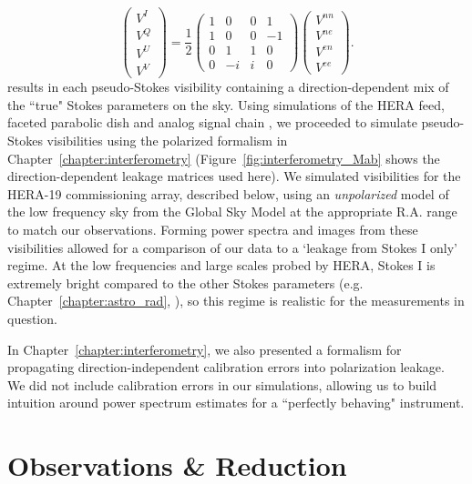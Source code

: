 \begin{equation}
\left(\begin{array}{c}
V^{I}\\
V^{Q}\\
V^{U}\\
V^{V}\end{array} \right)
= \frac{1}{2}
\left( \begin{array}{cccc}
1 & 0 & 0 & 1 \\
1 & 0 & 0 & -1 \\
0 & 1 & 1 & 0 \\
0 & -i & i & 0 \end{array} \right) 
\left(\begin{array}{c}
V^{nn}\\
V^{ne}\\
V^{en}\\
V^{ee}\end{array} \right) .
\label{eq:pseudo-stokes}
\end{equation}
results in each pseudo-Stokes visibility containing a direction-dependent mix of the ``true" Stokes parameters on the sky. Using simulations of the HERA feed, faceted parabolic dish and analog signal chain \citep{Fagnoni.16}, we proceeded to simulate pseudo-Stokes visibilities using the polarized formalism in Chapter~\ref{chapter:interferometry} (Figure~\ref{fig:interferometry_Mab} shows the direction-dependent leakage matrices used here). 
We simulated visibilities for the HERA-19 commissioning array, described below, using an \textit{unpolarized} model of the low frequency sky from the Global Sky Model \citep[GSM;]{GSM.08, pygsm, GSM.17} at the appropriate R.A. range to match our observations. Forming power spectra and images from these visibilities allowed for a comparison of our data to a `leakage from Stokes I only' regime. At the low frequencies and large scales probed by HERA, Stokes I is extremely bright compared to the other Stokes parameters (e.g. Chapter~\ref{chapter:astro_rad}, \citet{Kohn.16}), so this regime is realistic for the measurements in question.

In Chapter~\ref{chapter:interferometry}, we also presented a formalism for propagating direction-independent calibration errors into polarization leakage. We did not include calibration errors in our simulations, allowing us to build intuition around power spectrum estimates for a ``perfectly behaving" instrument.

\section{Observations \& Reduction}
\label{sec:hera19_obs}

